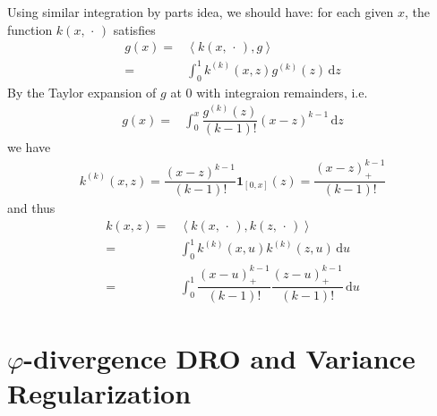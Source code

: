 \documentclass[11pt,a4paper]{ctexart}
\numberwithin{equation}{section}%
\begin{document}
Using similar integration by parts idea, we should have: for each given $ x $, the function $ k(x,\, \cdot \, ) $ satisfies
\begin{align*}
    g(x)=& \left\langle k(x,\, \cdot \, ), g \right\rangle \\
    =& \int_0^1 k^{(k)}(x,z)g^{(k)}(z)\,\mathrm{d}z
\end{align*}
By the Taylor expansion of $ g $ at $ 0 $ with integraion remainders, i.e.
\begin{align*}
     g(x) =& \int_0^x \dfrac{ g^{(k)}(z) }{ (k-1)! } (x-z)^{k-1}\,\mathrm{d}z 
\end{align*}
we have
\begin{align*}
    k^{(k)}(x,z) = \dfrac{ (x-z)^{k-1} }{ (k-1)! } \mathbf{1}_{[0,x]}(z) = \dfrac{ (x-z)^{k-1}_+ }{ (k-1)! }
\end{align*}
and thus
\begin{align*}
    k(x,z) =& \left\langle  k(x,\, \cdot \, ), k(z,\, \cdot \, ) \right\rangle \\
    =& \int_0^1 k^{(k)}(x,u)k^{(k)}(z,u)\,\mathrm{d}u\\
    =& \int_0^1 \dfrac{ (x-u)^{k-1}_+ }{ (k-1)! }\dfrac{ (z-u)^{k-1}_+ }{ (k-1)! }\,\mathrm{d}u
\end{align*}


\section{$ \varphi  $-divergence DRO and Variance Regularization}
\end{document}
